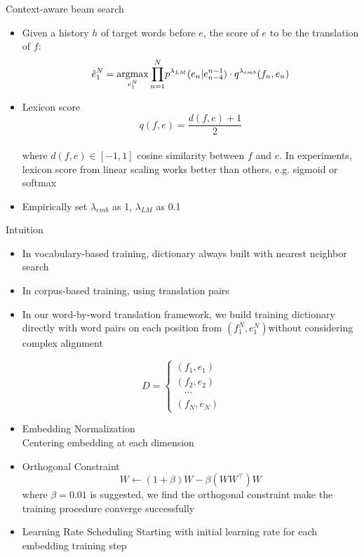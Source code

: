 \documentclass[11pt, a4paper, landscape]{article}
\newcommand*{\argmax}{\ensuremath{\operatornamewithlimits{argmax}}\xspace}
\begin{document}
	\NewPage
	\vfill
	Context-aware beam search
	\begin{itemize}
		\item 	Given a history $h$ of target words before $e$, the score of $e$ to be the translation of $f$:
		\[ \hat{e}_1^N = \argmax\limits_{e_1^N}{\prod_{n=1}^{N}} {p^{\lambda_{LM}}(e_n|e_{n-4}^{n-1}) \cdot q^{\lambda_{emb}}(f_n,e_n)}\]
		\item Lexicon score 		\[ q(f,e)= \frac{d(f,e)+1}{2}\] \\
		where $d(f,e)\in [-1,1]$ cosine similarity between $f$ and $e$. In experiments, lexicon score from linear scaling works better than others, e.g. sigmoid or softmax
		\item Empirically set ${\lambda_{emb}}$  as 1, ${\lambda_{LM}}$ as 0.1
	\end{itemize}
		
	\vfill

	
	\NewPage
	Intuition
	\begin{itemize}
		\item In vocabulary-based training, dictionary always built with nearest neighbor search
		\item In corpus-based training, using translation pairs
		\item In our word-by-word translation framework, we build training dictionary directly with word pairs on each position from $(f_1^N, e_1^N)$without considering complex alignment 
	\end{itemize}

	\[
	D = 
	\begin{cases}
		(f_1, e_1)\\
		(f_2, e_2)           \\
		\ \ \ \ 	\cdots\\
		(f_{N}, e_{N})
		\end{cases}
	\]
	\vfill
	\vfill
	
	\NewPage
	\vfill
	\begin{itemize}
		\item Embedding Normalization\\
		Centering embedding at each dimension\\
		\item Orthogonal Constraint
		\[ W \leftarrow (1+\beta) W - \beta(WW^\top)W\]
		where $\beta = 0.01$ is suggested, we find the orthogonal constraint make the training procedure converge successfully\\
		\item Learning Rate Scheduling 
		Starting with initial learning rate for each embedding training step

	\end{itemize}
	\vfill
	
\end{document}
